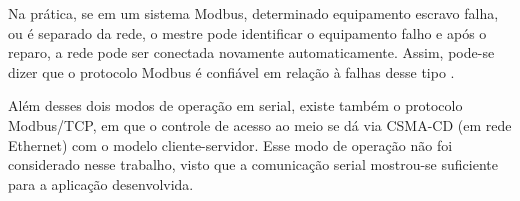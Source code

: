 \begin{table}[]
\centering
{}
\caption{Formato de Byte no Modo RTU}
\label{tab:RTU}
\end{table}

Na prática, se em um sistema Modbus, determinado equipamento escravo falha, ou é separado da rede, o mestre pode identificar o equipamento falho e após o reparo, a rede pode ser conectada novamente automaticamente. Assim, pode-se dizer que o protocolo Modbus é confiável em relação à falhas desse tipo \cite{peng2008modbus}.

Além desses dois modos de operação em serial, existe também o protocolo Modbus/TCP, em que o controle de acesso ao meio se dá via CSMA-CD (em rede Ethernet) com o modelo cliente-servidor. Esse modo de operação não foi considerado nesse trabalho, visto que a comunicação serial mostrou-se suficiente para a aplicação desenvolvida.


